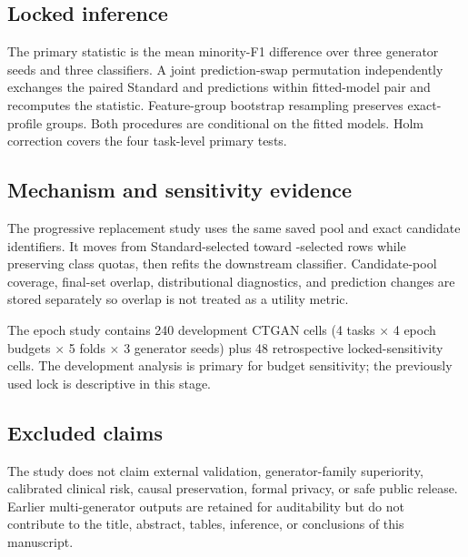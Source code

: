 \subsection{Locked inference}

The primary statistic is the mean minority-F1 difference over three generator seeds and three classifiers. A joint prediction-swap permutation independently exchanges the paired Standard and \sepa{} predictions within fitted-model pair and recomputes the statistic. Feature-group bootstrap resampling preserves exact-profile groups. Both procedures are conditional on the fitted models. Holm correction covers the four task-level primary tests.

\subsection{Mechanism and sensitivity evidence}

The progressive replacement study uses the same saved pool and exact candidate identifiers. It moves from Standard-selected toward \sepa{}-selected rows while preserving class quotas, then refits the downstream classifier. Candidate-pool coverage, final-set overlap, distributional diagnostics, and prediction changes are stored separately so overlap is not treated as a utility metric.

The epoch study contains 240 development CTGAN cells (4 tasks $\times$ 4 epoch budgets $\times$ 5 folds $\times$ 3 generator seeds) plus 48 retrospective locked-sensitivity cells. The development analysis is primary for budget sensitivity; the previously used lock is descriptive in this stage.

\subsection{Excluded claims}

The study does not claim external validation, generator-family superiority, calibrated clinical risk, causal preservation, formal privacy, or safe public release. Earlier multi-generator outputs are retained for auditability but do not contribute to the title, abstract, tables, inference, or conclusions of this manuscript.
